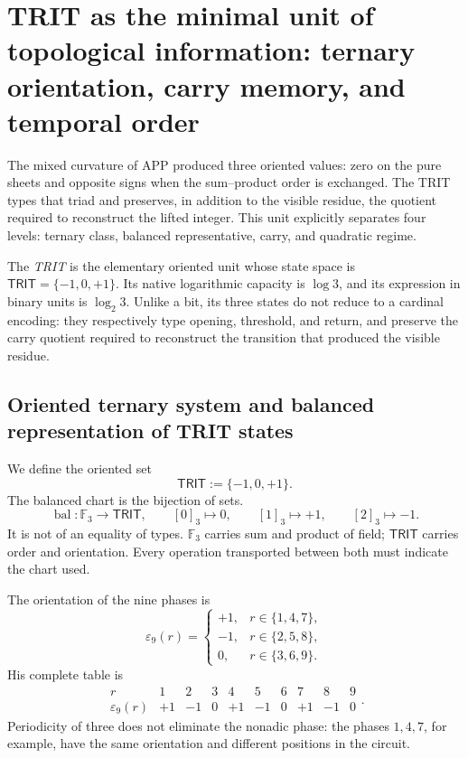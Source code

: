 
\section{TRIT as the minimal unit of topological information: ternary orientation, carry memory, and temporal order}
\label{p12-83-c1-s11:chap:trit-levantado-regimenes}

The mixed curvature of APP produced three oriented values: zero on the pure sheets and opposite signs when the sum--product order is exchanged. The TRIT types that triad and preserves, in addition to the visible residue, the quotient required to reconstruct the lifted integer. This unit explicitly separates four levels: ternary class, balanced representative, carry, and quadratic regime.

\begin{definition}
The \emph{TRIT} is the elementary oriented unit whose state space is
\(\mathsf{TRIT}=\{-1,0,+1\}\). Its native logarithmic capacity is
\(\log 3\), and its expression in binary units is \(\log_2 3\). Unlike
a bit, its three states do not reduce to a cardinal encoding: they respectively type
opening, threshold, and return, and preserve the carry quotient
required to reconstruct the transition that produced the visible
residue.
\end{definition}

\subsection{Oriented ternary system and balanced representation of TRIT states}

We define the oriented set
\[
 \mathsf{TRIT}:=\{-1,0,+1\}.
\]
The balanced chart is the bijection of sets.
\[
 \operatorname{bal}:\mathbb F_3\longrightarrow\mathsf{TRIT},
 \qquad
 [0]_3\mapsto0,\qquad[1]_3\mapsto+1,\qquad[2]_3\mapsto-1.
\]
It is not of an equality of types. \(\mathbb F_3\) carries sum and product
of field; \(\mathsf{TRIT}\) carries order and orientation. Every operation
transported between both must indicate the chart used.

The orientation of the nine phases is
\[
 \varepsilon_9(r)=
 \begin{cases}
 +1,&r\in\{1,4,7\},\\
 -1,&r\in\{2,5,8\},\\
 0,&r\in\{3,6,9\}.
 \end{cases}
\]
His complete table is
\[
\begin{array}{c|ccccccccc}
r&1&2&3&4&5&6&7&8&9\\\hline
\varepsilon_9(r)&+1&-1&0&+1&-1&0&+1&-1&0
\end{array}.
\]
Periodicity of three does not eliminate the nonadic phase: the phases
\(1,4,7\), for example, have the same orientation and different positions
in the circuit.

